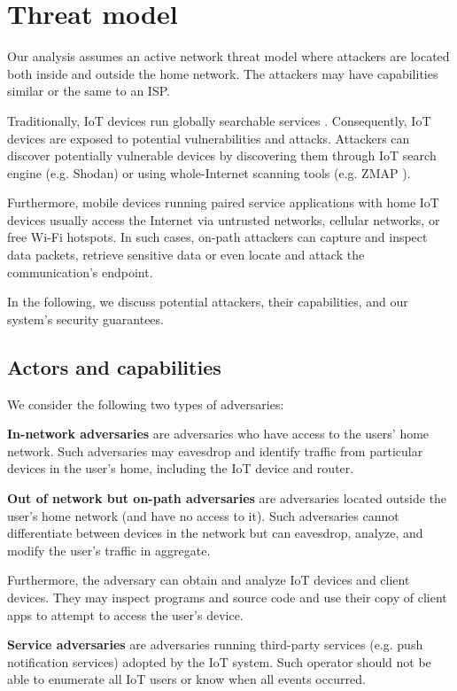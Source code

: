 \section{Threat model}

Our analysis assumes an active network threat model where attackers are located both inside and outside the home network. The attackers may have capabilities similar or the same to an ISP.

Traditionally, IoT devices run globally searchable services \cite{antonakakis2017understanding}. Consequently, IoT devices are exposed to potential vulnerabilities and attacks. Attackers can discover potentially vulnerable devices by discovering them through IoT search engine (e.g. Shodan) or using whole-Internet scanning tools (e.g. ZMAP \cite{wiemer2001software}).

Furthermore, mobile devices running paired service applications with home IoT devices usually access the Internet via untrusted networks, cellular networks, or free Wi-Fi hotspots. In such cases, on-path attackers can capture and inspect data packets, retrieve sensitive data or even locate and attack the communication's endpoint. 

In the following, we discuss potential attackers, their capabilities, and our system's security guarantees.

\subsection{Actors and capabilities}
We consider the following two types of adversaries:

\textbf{In-network adversaries} are adversaries who have access to the users' home network. Such adversaries may eavesdrop and identify traffic from particular devices in the user's home, including the IoT device and router.


\textbf{Out of network but on-path adversaries} are adversaries located outside the user's home network (and have no access to it). Such adversaries cannot differentiate between devices in the network but can eavesdrop, analyze, and modify the user’s traffic in aggregate. 

Furthermore, the adversary can obtain and analyze IoT devices and client devices. They may inspect programs and source code and use their copy of client apps to attempt to access the user's device.

\textbf{Service adversaries} are adversaries running third-party services (e.g. push notification services) adopted by the IoT system. Such operator should not be able to enumerate all IoT users or know when all events occurred.

